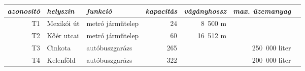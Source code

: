 \sf
\centering
\begin{tabular}{rllrrrr}
	\toprule
	\it azonosító & \it helyszín & \it funkció      & \it kapacitás & \it vágányhossz & \it max. üzemanyag &  \\ \midrule
	           T1 & Mexikói út   & metró járműtelep &            24 &         8~500 m &                    &  \\
	           T2 & Kőér utcai   & metró járműtelep &            60 &        16~512 m &                    &  \\
	           T3 & Cinkota      & autóbuszgarázs   &           265 &                 &      250~000 liter &  \\
	           T4 & Kelenföld    & autóbuszgarázs   &           322 &                 &      200~000 liter &  \\ \bottomrule
\end{tabular}



